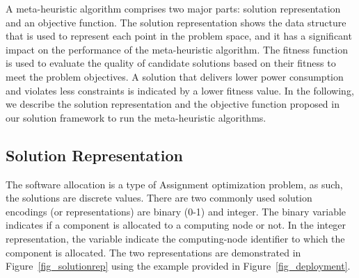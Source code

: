 A meta-heuristic algorithm comprises two major parts: solution representation and an objective function. The solution representation shows the data structure that is used to represent each point in the problem space, and it has a significant impact on the performance of the meta-heuristic algorithm. The fitness function is used to evaluate the quality of candidate solutions based on their fitness to meet the problem objectives. A solution that delivers lower power consumption and violates less constraints is indicated by a lower fitness value. In the following, we describe the solution representation and the objective function proposed in our solution framework to run the meta-heuristic algorithms. 

\subsection{Solution Representation}
The software allocation is a type of Assignment optimization problem, as such, the solutions are discrete values. There are two commonly used solution encodings (or representations) are binary (0-1) and integer. The binary variable indicates if a component is allocated to a computing node or not. In the integer representation, the variable indicate the computing-node identifier to which the component is allocated. The two representations are demonstrated in Figure~\ref{fig_solutionrep} using the example provided in Figure~\ref{fig_deployment}. 
